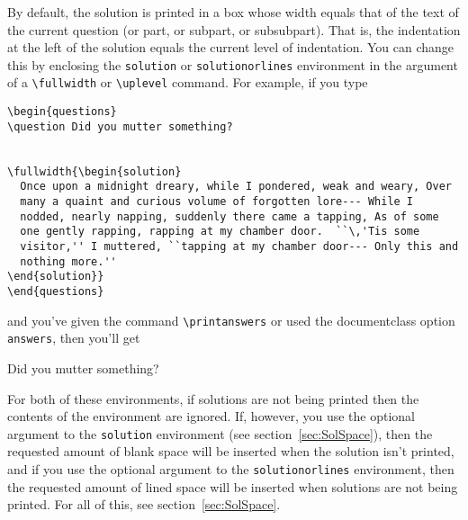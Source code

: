 \documentclass[12pt]{exam}
\begin{document}
By default, the solution is printed in a box whose width equals that
of the text of the current question (or part, or subpart, or
subsubpart).  That is, the indentation at the left of the solution
equals the current level of indentation.  You can change this by
enclosing the \verb"solution" or \verb"solutionorlines" environment in
the argument of a \verb"\fullwidth" or \verb"\uplevel" command.  For
example, if you type
\begin{verbatim}
\begin{questions}
\question Did you mutter something?


\fullwidth{\begin{solution}
  Once upon a midnight dreary, while I pondered, weak and weary, Over
  many a quaint and curious volume of forgotten lore--- While I
  nodded, nearly napping, suddenly there came a tapping, As of some
  one gently rapping, rapping at my chamber door.  ``\,'Tis some
  visitor,'' I muttered, ``tapping at my chamber door--- Only this and
  nothing more.''
\end{solution}}
\end{questions}
\end{verbatim}
and you've given the command \verb"\printanswers" or used the
documentclass option \verb"answers", then you'll get
\bigskip
\begin{questions}
\question Did you mutter something?


\end{questions}



For both of these environments, if solutions are not being printed
then the contents of the environment are ignored.  If, however, you
use the optional argument to the \verb"solution" environment (see
section~\ref{sec:SolSpace}), then the requested amount of blank space
will be inserted when the solution isn't printed, and if you use the
optional argument to the \verb"solutionorlines" environment, then the
requested amount of lined space will be inserted when solutions are
not being printed.  For all of this, see section~\ref{sec:SolSpace}.
\end{document}
